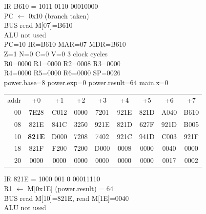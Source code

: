 \noindent\begin{tcolorbox}[stepbox, title={Step 34 \hfill PC 07 \quad BLE power.endwhile1}]
\textcolor{dim}{IR} B610 = 1011 0110 00010000\\
PC $\leftarrow$ 0x10 (branch taken)\\
\textcolor{dim}{BUS} read M[07]=B610\\
\textcolor{dim}{ALU} \textcolor{dim}{not used}\\
PC=10 IR=B610 MAR=07 MDR=B610\\
Z=1 N=0 C=0 V=0 \hfill \textcolor{dim}{3 clock cycles}\\
R0=0000 R1=0000 R2=0008 R3=0000\\
R4=0000 R5=0000 R6=0000 SP=0026\\
\textcolor{dim}{power.base=8  power.exp=0  power.result=64  main.x=0}\\[1pt]
{\setlength{\tabcolsep}{1.6pt}\begin{tabular}{@{}r*{8}{c}@{}}
\textcolor{dim}{addr} & \textcolor{dim}{+0} & \textcolor{dim}{+1} & \textcolor{dim}{+2} & \textcolor{dim}{+3} & \textcolor{dim}{+4} & \textcolor{dim}{+5} & \textcolor{dim}{+6} & \textcolor{dim}{+7}\\
\textcolor{dim}{00} & 7E28 & C012 & 0000 & 7201 & 921E & 821D & A040 & B610\\
\textcolor{dim}{08} & 821E & 841C & 3250 & 921E & 821D & 627F & 921D & B005\\
\textcolor{dim}{10} & \cellcolor{pcc}\textbf{821E} & D000 & 7208 & 7402 & 921C & 941D & C003 & 921F\\
\textcolor{dim}{18} & 821F & F200 & 7200 & D000 & \cellcolor{datac}0008 & \cellcolor{datac}0000 & \cellcolor{datac}0040 & \cellcolor{datac}0000\\
\textcolor{dim}{20} & \cellcolor{stackc}0000 & \cellcolor{stackc}0000 & \cellcolor{stackc}0000 & \cellcolor{stackc}0000 & \cellcolor{stackc}0000 & \cellcolor{stackc}0000 & \cellcolor{stackc}0017 & \cellcolor{stackc}0002\\
\end{tabular}}
\end{tcolorbox}\hfill\begin{tcolorbox}[stepbox, title={Step 35 \hfill PC 10 \quad LD R1, power.result}]
\textcolor{dim}{IR} 821E = 1000 001 0 00011110\\
R1 $\leftarrow$ M[0x1E] (power.result) = 64\\
\textcolor{dim}{BUS} read M[10]=821E, read M[1E]=0040\\
\textcolor{dim}{ALU} \textcolor{dim}{not used}\\

\end{tcolorbox}
